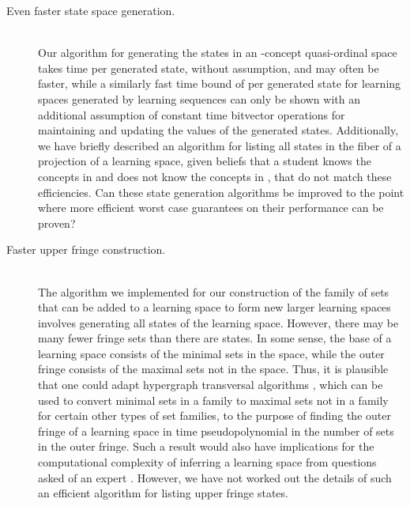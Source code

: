 \documentclass[11pt]{llncs}
\begin{document}
{\begin{description}
\item[Even faster state space generation.] \hfill\\
Our algorithm for generating the states in an -concept quasi-ordinal space takes time  per generated state, without assumption, and may often be faster, while a similarly fast time bound of  per generated state for learning spaces generated by  learning sequences can only  be shown with an additional assumption of constant time bitvector operations for maintaining and updating the  values of the generated states. Additionally, we have briefly described an algorithm for listing all states in the fiber  of a projection of a learning space, given beliefs that a student knows the concepts in  and does not know the concepts in , that do not match these efficiencies. Can these state generation algorithms be improved to the point where more efficient worst case guarantees on their performance can be proven?

\item[Faster upper fringe construction.] \hfill\\
The algorithm we implemented for our construction of the family of sets that can be added to a learning space to form new larger learning spaces involves generating all states of the learning space. However, there may be many fewer fringe sets than there are states.  In some sense, the base of a learning space consists of the minimal sets in the space, while the outer fringe consists of the maximal sets not in the space.  Thus, it is plausible that one could adapt hypergraph transversal algorithms \citep{FreKha-Algs-96}, which can be used to convert minimal sets in a family to maximal sets not in a family for certain other types of set families, to the purpose of finding the outer fringe of a learning space in time pseudopolynomial in the number of sets in the outer fringe. Such a result would also have implications for the computational complexity of inferring a learning space from questions asked of an expert \citep{dowling:93a}. However, we have not worked out the details of such an efficient  algorithm for listing upper fringe states.


\end{description}}
\end{document}
